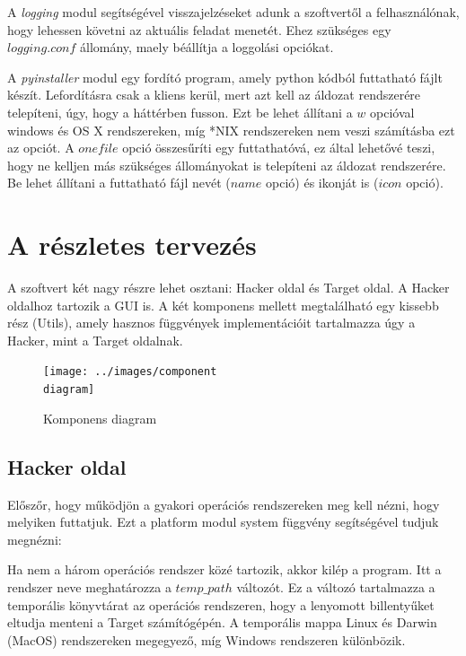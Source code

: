 \documentclass[12pt,a4paper,oneside]{report}
\begin{document}
A \emph{logging} modul segítségével visszajelzéseket adunk a szoftvertől a felhasználónak, hogy lehessen követni az aktuális feladat menetét. Ehez szükséges egy $logging.conf$ állomány, maely béállítja a loggolási opciókat.

A \emph{pyinstaller} modul egy fordító program, amely python kódból futtatható fájlt készít. Lefordításra csak a kliens kerül, mert azt kell az áldozat rendszerére telepíteni, úgy, hogy a háttérben fusson. Ezt be lehet állítani a $w$ opcióval windows és OS X rendszereken, míg *NIX rendszereken nem veszi számításba ezt az opciót. A $onefile$ opció összesűríti egy futtathatóvá, ez által lehetővé teszi, hogy ne kelljen más szükséges állományokat is telepíteni az áldozat rendszerére. Be lehet állítani a futtatható fájl nevét ($name$ opció) és ikonját is ($icon$ opció).



\chapter{A részletes tervezés}\label{sec:plan}

A szoftvert két nagy részre lehet osztani: Hacker oldal és Target oldal. A Hacker oldalhoz tartozik a GUI is. A két komponens mellett megtalálható egy kissebb rész (Utils), amely hasznos függvények implementációit tartalmazza úgy a Hacker, mint a Target oldalnak.
\begin{figure}[H]
\centering
\texttt{[image: ../images/component\\ diagram]}
\caption{Komponens diagram}
\label{fig:compdia}
\end{figure}

\section{Hacker oldal}\label{subsec:server}
Előszőr, hogy működjön a gyakori operációs rendszereken meg kell nézni, hogy melyiken futtatjuk. Ezt a platform modul system függvény segítségével tudjuk megnézni:



Ha nem a három operációs rendszer közé tartozik, akkor kilép a program. Itt a rendszer neve meghatározza a $temp\_path$ változót. Ez a változó tartalmazza a temporális könyvtárat az operációs rendszeren, hogy a lenyomott billentyűket eltudja menteni a Target számítógépén. A temporális mappa Linux és Darwin (MacOS) rendszereken megegyező, míg Windows rendszeren különbözik.
\end{document}
